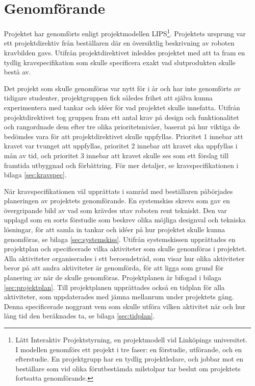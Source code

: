 

\section{Genomförande}
\label{sec:utforande}
Projektet har genomförts enligt projektmodellen LIPS\footnote{Lätt Interaktiv Projektstyrning, en projektmodell vid Linköpings universitet. I modellen genomförs ett projekt i tre faser: en förstudie, utförande, och en efterstudie. En projektgrupp har en tydlig projektledare, och jobbar mot en beställare som vid olika förutbestämda milstolpar tar beslut om projektets fortsatta genomförande.}. Projektets ursprung var ett projektdirektiv från beställaren där en översiktlig beskrivning av roboten  kravbilden gavs. Utifrån projektdirektivet inleddes projektet med att ta fram en tydlig kravspecifikation som skulle specificera exakt vad slutprodukten skulle bestå av.

Det projekt som skulle genomföras var nytt för i år och har inte genomförts av tidigare studenter, projektgruppen fick således frihet att själva kunna experimentera med tankar och idéer för vad projektet skulle innefatta. Utifrån projektdirektivet tog gruppen fram ett antal krav på design och funktionalitet och rangordnade dem efter tre olika prioritetsnivåer, baserat på hur viktiga de bedömdes vara för att projektdirektivet skulle uppfyllas. Prioritet 1 innebar att kravet var tvunget att uppfyllas, prioritet 2 innebar att kravet ska uppfyllas i mån av tid, och prioritet 3 innebar att kravet skulle ses som ett förslag till framtida utbyggnad och förbättring. För mer detaljer, se kravspecifikationen i bilaga \ref{sec:kravspec}.

När kravspecifikationen väl upprättats i samråd med beställaren påbörjades planeringen av projektets genomförande. En systemskiss skrevs som gav en övergripande bild av vad som krävdes utav roboten rent tekniskt. Den var upplagd som en sorts förstudie som beskrev olika möjliga designval och tekniska lösningar, för att samla in tankar och idéer på hur projektet skulle kunna genomföras, se bilaga \ref{sec:systemskiss}. Utifrån systemskissen upprättades en projektplan och specificerade vilka aktiviteter som skulle genomföras i projektet. Alla aktiviteter organiserades i ett beroendeträd, som visar hur olika aktiviteter beror på att andra aktiviteter är genomförda, för att ligga som grund för planering av när de skulle genomföras. Projektplanen är bifogad i bilaga \ref{sec:projektplan}. Till projektplanen upprättades också en tidplan för alla aktiviteter, som uppdaterades med jämna mellanrum under projektets gång. Denna specificerade noggrant vem som skulle utföra vilken aktivitet när och hur lång tid den beräknades ta, se bilaga \ref{sec:tidplan}.

